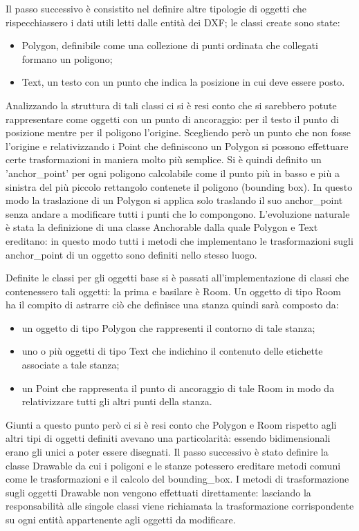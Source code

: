 \documentclass[12pt]{report}
\begin{document}
Il passo successivo è consistito nel definire altre tipologie di oggetti che rispecchiassero i dati utili letti dalle entità dei DXF; le classi create sono state:
\begin{itemize}
\item Polygon, definibile come una collezione di punti ordinata che collegati formano un poligono;
\item Text, un testo con un punto che indica la posizione in cui deve essere posto.
\end{itemize}

Analizzando la struttura di tali classi ci si è resi conto che si sarebbero potute rappresentare come oggetti con un punto di ancoraggio: per il testo il punto di posizione mentre per il poligono l'origine. 
Scegliendo però un punto che non fosse l'origine e relativizzando i Point che definiscono un Polygon si possono effettuare certe trasformazioni in maniera molto più semplice. Si è quindi definito un 'anchor\_point' per ogni poligono calcolabile come il punto più in basso e più a sinistra del più piccolo rettangolo contenete il poligono (bounding box). 
In questo modo la traslazione di un Polygon si applica solo traslando il suo anchor\_point senza andare a modificare tutti i punti che lo compongono. 
L'evoluzione naturale è stata la definizione di una classe Anchorable dalla quale Polygon e Text ereditano: in questo modo tutti i metodi che implementano le trasformazioni sugli anchor\_point di un oggetto sono definiti nello stesso luogo.

Definite le classi per gli oggetti base si è passati all'implementazione di classi che contenessero tali oggetti: la prima e basilare è Room.
Un oggetto di tipo Room ha il compito di astrarre ciò che definisce una stanza quindi sarà composto da:
\begin{itemize}
\item un oggetto di tipo Polygon che rappresenti il contorno di tale stanza;
\item uno o più oggetti di tipo Text che indichino il contenuto delle etichette associate a tale stanza;
\item un Point che rappresenta il punto di ancoraggio di tale Room in modo da relativizzare tutti gli altri punti della stanza.
\end{itemize}

Giunti a questo punto però ci si è resi conto che Polygon e Room rispetto agli altri tipi di oggetti definiti avevano una particolarità: essendo bidimensionali erano gli unici a poter essere disegnati.
Il passo successivo è stato definire la classe Drawable da cui i poligoni e le stanze potessero ereditare metodi comuni come le trasformazioni e il calcolo del bounding\_box.
I metodi di trasformazione sugli oggetti Drawable non vengono effettuati direttamente: lasciando la responsabilità alle singole classi viene richiamata la trasformazione corrispondente su ogni entità appartenente agli oggetti da modificare.
\end{document}

